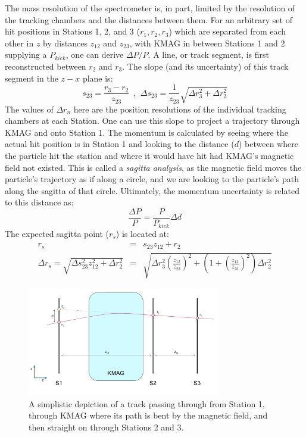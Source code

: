 The mass resolution of the spectrometer is, in part, limited by the resolution of the tracking chambers and the distances between them. For an arbitrary set of hit positions in Stations 1, 2, and 3 ($r_1, r_2, r_3$) which are separated from each other in $z$ by distances $z_{12}$ and $z_{23}$, with KMAG in between Stations 1 and 2 supplying a $P_{kick}$, one can derive $\Delta P / P$. A line, or track segment, is first reconstructed between $r_2$ and $r_3$. The slope (and its uncertainty) of this track segment in the $z-x$ plane is:
\begin{equation}
s_{23} = \frac{r_3 - r_2}{z_{23}} \ \ ,\ \ \Delta s_{23} = \frac{1}{z_{23}}\sqrt{\Delta r_3^2 + \Delta r_2^2}
\end{equation}
The values of $\Delta r_n$ here are the position resolutions of the individual tracking chambers at each Station. One can use this slope to project a trajectory through KMAG and onto Station 1. The momentum is calculated by seeing where the actual hit position is in Station 1 and looking to the distance ($d$) between where the particle hit the station and where it would have hit had KMAG's magnetic field not existed. This is called a \emph{sagitta analysis}, as the magnetic field moves the particle's trajectory as if along a circle, and we are looking to the particle's path along the sagitta of that circle. Ultimately, the momentum uncertainty is related to this distance as:
\begin{equation}
\frac{\Delta P }{P} = \frac{P}{P_{kick}}\Delta d
\end{equation}
The expected sagitta point ($r_s$) is located at:
\begin{eqnarray}
r_s & = & s_{23} z_{12} + r_2 \\
\Delta r_s = \sqrt{\Delta s_{23}^2 z_{12}^2 + \Delta r_2^2} & = & \sqrt{ \Delta r_3^2 \left(\frac{z_{12}}{z_{23}}\right)^2 + (1+\left(\frac{z_{12}}{z_{23}}\right)^2) \Delta r_2^2}
\end{eqnarray}
\begin{figure}[t]
	\centering
	\includegraphics[width=0.75\textwidth]{figures/apparatus/momentum-resolution.pdf}
	\caption{A simplistic depiction of a track passing through from Station 1, through KMAG where its path is bent by the magnetic field, and then straight on through Stations 2 and 3.}
	\label{fig:mom-res}
\end{figure}
